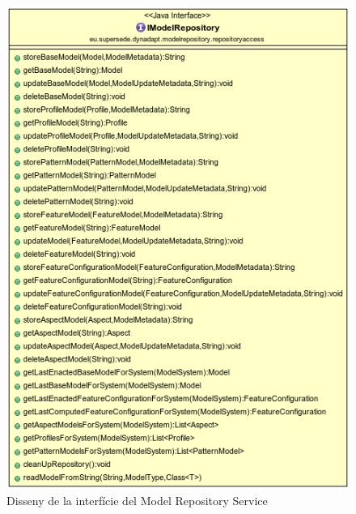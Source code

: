 \begin{figure}
\centering
\includegraphics[width=14cm]{Figures/Figure25}
\decoRule
\caption{Disseny de la interfície del Model Repository Service}
\label{fig:Figura25}
\end{figure}

